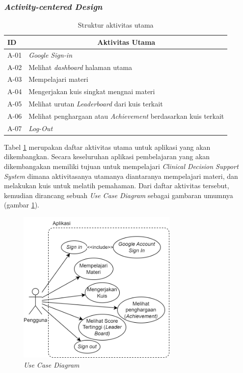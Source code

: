 \subsubsection{\textit{Activity-centered Design}}
\begin{table}[H]
	\centering
	\caption{Struktur aktivitas utama}
	\begin{tabular}{|m{1cm}|m{}|}
		\hline
		\textbf{ID} & \multicolumn{1}{c|}{\centering \textbf{Aktivitas Utama}}\\
		\hline
		A-01 & \textit{Google Sign-in} \\
		\hline
		A-02 & Melihat \textit{dashboard} halaman utama\\
		\hline
		A-03 & Mempelajari materi\\
		\hline
		A-04 & Mengerjakan kuis singkat mengnai materi \\
		\hline
		A-05 & Melihat urutan \textit{Leaderboard} dari kuis terkait\\
		\hline
		A-06 & Melihat penghargaan atau \textit{Achievement} berdasarkan kuis terkait \\
		\hline
		A-07 & \textit{Log-Out}\\
		\hline
	\end{tabular}
	\label{Tab: Tabel Main Activity}
\end{table}
Tabel \ref*{Tab: Tabel Main Activity} merupakan daftar aktivitas utama untuk aplikasi yang akan dikembangkan.
Secara keseluruhan aplikasi pembelajaran yang akan dikembangakan memiliki tujuan untuk mempelajari \textit{Clinical Decision Support System} dimana aktivitasanya utamanya diantaranya mempelajari materi, dan melakukan kuis untuk melatih pemahaman.
Dari daftar aktivitas tersebut, kemudian dirancang sebuah \textit{Use Case Diagram} sebagai gambaran umumnya (gambar \ref*{Fig:Use Case Diagram}). 
\begin{figure}[H]
	\centering
	\includegraphics[width=0.7\textwidth]{contents/chapter-3/images/Use-Case-Diagram.png}
	\caption[Caption]{\textit{Use Case Diagram}}
	\label{Fig:Use Case Diagram}
\end{figure}

